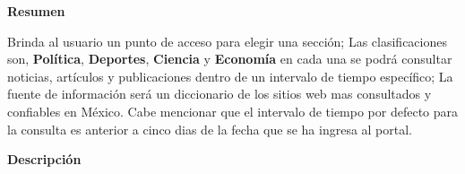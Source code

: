 
\begin{large}
	\textbf{Resumen}\\
\end{large}

Brinda al usuario un punto de acceso para elegir una sección; Las clasificaciones son, \textbf{Política}, \textbf{Deportes}, \textbf{Ciencia} y \textbf{Economía} en cada una se podrá consultar noticias, artículos y publicaciones dentro de un intervalo de tiempo específico; La fuente de información será un diccionario de los sitios web mas consultados y confiables en México. Cabe mencionar que el intervalo de tiempo por defecto para la consulta es anterior a cinco dias de la fecha que se ha ingresa al portal.\\

\begin{large}
	\textbf{Descripción}\\
\end{large}

